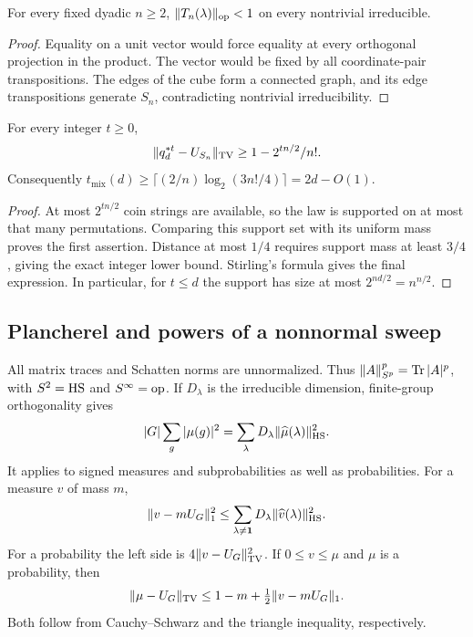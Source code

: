 \begin{lemma}\label{lem:finitegap}
For every fixed dyadic $n\ge2$, $\|T_n(\lambda)\|_{\mathrm{op}}<1$ on every nontrivial irreducible.
\end{lemma}
\begin{proof}
Equality on a unit vector would force equality at every orthogonal projection in the product. The vector would be fixed by all coordinate-pair transpositions. The edges of the cube form a connected graph, and its edge transpositions generate $S_n$, contradicting nontrivial irreducibility.
\end{proof}

\begin{lemma}\label{lem:support}\label{tra:fractional-density:support-order-conclusion}
For every integer $t\ge0$,
\[
 \|q_d^{*t}-U_{S_n}\|_{\mathrm{TV}}\ge1-2^{tn/2}/n!.
\]
Consequently $t_{\mathrm{mix}}(d)\ge\lceil(2/n)\log_2(3n!/4)\rceil=2d-O(1)$.
\end{lemma}
\begin{proof}
At most $2^{tn/2}$ coin strings are available, so the law is supported on at most that many permutations. Comparing this support set with its uniform mass proves the first assertion. Distance at most $1/4$ requires support mass at least $3/4$, giving the exact integer lower bound. Stirling's formula gives the final expression. In particular, for $t\le d$ the support has size at most $2^{nd/2}=n^{n/2}$.
\end{proof}

\subsection{Plancherel and powers of a nonnormal sweep}
All matrix traces and Schatten norms are unnormalized. Thus $\|A\|_{S^p}^p=\operatorname{Tr}|A|^p$, with $S^2=\mathrm{HS}$ and $S^\infty=\mathrm{op}$. If $D_\lambda$ is the irreducible dimension, finite-group orthogonality gives
\[
 |G|\sum_g|\mu(g)|^2=\sum_\lambda D_\lambda\|\widehat\mu(\lambda)\|_{\mathrm{HS}}^2.
\]
It applies to signed measures and subprobabilities as well as probabilities. For a measure $v$ of mass $m$,
\begin{equation}\label{eq:plancherel}
 \|v-mU_G\|_1^2\le
 \sum_{\lambda\ne\mathbf1}D_\lambda\|\widehat v(\lambda)\|_{\mathrm{HS}}^2.
\end{equation}
For a probability the left side is $4\|v-U_G\|_{\mathrm{TV}}^2$. If $0\le v\le\mu$ and $\mu$ is a probability, then
\begin{equation}\label{eq:lostmass}
 \|\mu-U_G\|_{\mathrm{TV}}\le1-m+\tfrac12\|v-mU_G\|_1.
\end{equation}
Both follow from Cauchy--Schwarz and the triangle inequality, respectively.

